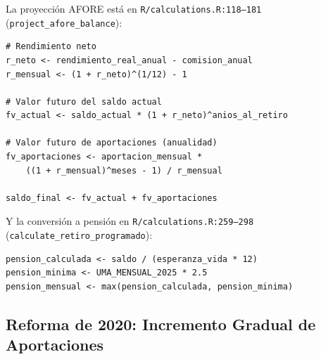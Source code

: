 \documentclass[11pt,a4paper]{report}
\begin{document}
\begin{tcolorbox}[colback=orange!5!white, colframe=orange!75!black, title=\textbf{Aplicaci\'on en C\'odigo}]
La proyecci\'on AFORE est\'a en \texttt{R/calculations.R:118--181} (\texttt{project\_afore\_balance}):

\begin{lstlisting}
# Rendimiento neto
r_neto <- rendimiento_real_anual - comision_anual
r_mensual <- (1 + r_neto)^(1/12) - 1

# Valor futuro del saldo actual
fv_actual <- saldo_actual * (1 + r_neto)^anios_al_retiro

# Valor futuro de aportaciones (anualidad)
fv_aportaciones <- aportacion_mensual *
    ((1 + r_mensual)^meses - 1) / r_mensual

saldo_final <- fv_actual + fv_aportaciones
\end{lstlisting}

Y la conversi\'on a pensi\'on en \texttt{R/calculations.R:259--298} (\texttt{calculate\_retiro\_programado}):
\begin{lstlisting}
pension_calculada <- saldo / (esperanza_vida * 12)
pension_minima <- UMA_MENSUAL_2025 * 2.5
pension_mensual <- max(pension_calculada, pension_minima)
\end{lstlisting}
\end{tcolorbox}

\subsection{Reforma de 2020: Incremento Gradual de Aportaciones}
\end{document}
